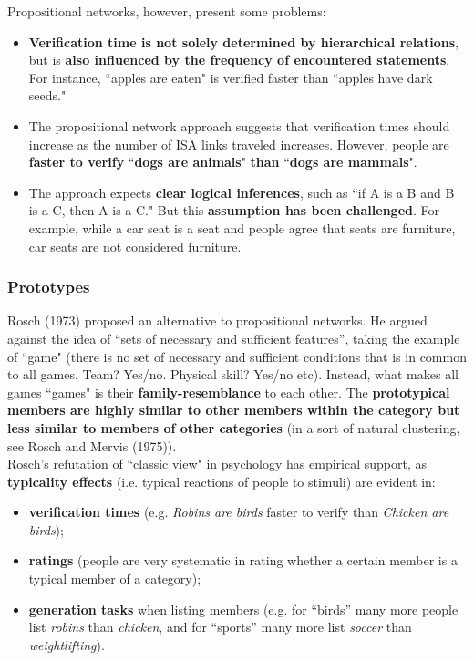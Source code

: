 Propositional networks, however, present some problems:
\begin{itemize}
    \item \textbf{Verification time is not solely determined by hierarchical relations}, but is \textbf{also influenced by the frequency of encountered statements}. For instance, ``apples are eaten" is verified faster than ``apples have dark seeds."
    \item The propositional network approach suggests that verification times should increase as the number of ISA links traveled increases. However, people are \textbf{faster to verify} ``\textbf{dogs are animals}" \textbf{than} ``\textbf{dogs are mammals}".
    \item The approach expects \textbf{clear logical inferences}, such as ``if A is a B and B is a C, then A is a C." But this \textbf{assumption has been challenged}. For example, while a car seat is a seat and people agree that seats are furniture, car seats are not considered furniture.
\end{itemize}

\subsubsection{Prototypes}
Rosch (1973) proposed an alternative to propositional networks. He argued against the idea of ``sets of necessary and sufficient features”, taking the example of ``game" (there is no set of necessary and sufficient conditions that is in common to all games. Team? Yes/no. Physical skill? Yes/no etc).
Instead, what makes all games ``games" is their \textbf{family-resemblance} to each other. The \textbf{prototypical members are highly similar to other members within the category but less similar to members of other categories} (in a sort of natural clustering, see \notedv Rosch and Mervis (1975)).\\

Rosch's refutation of ``classic view" in psychology has empirical support, as \textbf{typicality effects} (i.e. typical reactions of people to stimuli) are evident in:
\begin{itemize}
    \item \textbf{verification times} (e.g. \textit{Robins are birds} faster to verify than \textit{Chicken are birds});
    \item \textbf{ratings} (people are very systematic in rating whether a certain member is a typical member of a category);
    \item \textbf{generation tasks} when listing members (e.g. for ``birds” many more people list \textit{robins} than \textit{chicken}, and for ``sports” many more list \textit{soccer} than \textit{weightlifting}). 
\end{itemize}

